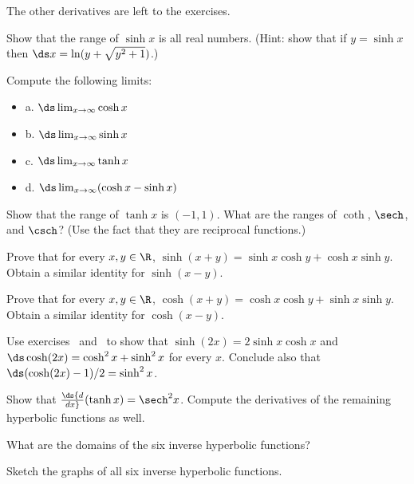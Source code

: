 The other derivatives are left to the exercises.


\begin{exercises}

\begin{exercise} Show that the range of $\sinh x$ is all real
numbers. (Hint: show that if $y=\sinh x$ then 
$\ds x =\ln (y+\sqrt{y^2+1})$.) 
\end{exercise}

\begin{exercise} Compute the following limits:
\begin{itemize} %

\item{a.} $\ds  \lim_{x\to \infty } \cosh x$
\item{b.} $\ds  \lim_{x\to \infty } \sinh x$
\item{c.} $\ds  \lim_{x\to \infty } \tanh x$
\item{d.} $\ds  \lim_{x\to \infty } (\cosh x -\sinh x)$

\end{itemize}\end{exercise}

\begin{exercise} Show that the range of $\tanh x$ is $(-1,1)$. What
are the ranges of $\coth$, $\sech$, and $\csch$? 
(Use the fact that they are reciprocal functions.) 
\end{exercise}

\begin{exercise}
\label{exer:sinhid} 
Prove that for every $x,y\in\R$, $\sinh (x+y)
=\sinh x \cosh y + \cosh x \sinh y$. Obtain a similar identity for
$\sinh(x-y)$.
\end{exercise}

\begin{exercise}
\label{exer:coshid} 
Prove that for every $x,y\in\R$, $\cosh (x+y) =\cosh x \cosh y + \sinh x
  \sinh y$. Obtain a similar identity for $\cosh(x-y)$.
\end{exercise}

\begin{exercise} 
\label{exer:hyperbolic double angle formulas}
Use exercises~ and~ 
to
show that $\sinh(2x)=2\sinh x \cosh x$ and $\ds \cosh(2x)=\cosh^2 x
+\sinh^2 x$ for every $x$.  Conclude also that $\ds (\cosh (2x) -1)/2 = \sinh
^2 x$.
\end{exercise}

\begin{exercise} Show that $\ds {d\over dx} (\tanh x) =\sech^2 x$. Compute
  the derivatives of the remaining hyperbolic functions as well.
\end{exercise}

\begin{exercise} What are the domains of the six inverse hyperbolic
functions?
\end{exercise}

\begin{exercise} Sketch the graphs of all six inverse hyperbolic
  functions. 
\end{exercise}

\end{exercises}
